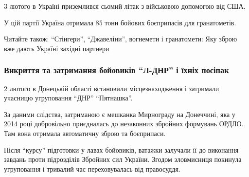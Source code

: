 3 лютого в Україні приземлився сьомий літак з військовою допомогою від США.

У цій партії Україна отримала 85 тонн бойових боєприпасів для гранатометів.

Читайте також: \enquote{Стінгери}, \enquote{Джавеліни}, вогнемети і
гранатомети: Яку зброю вже дають Україні західні партнери

\subsubsection{Викриття та затримання бойовиків \enquote{Л-ДНР} і їхніх
посіпак}

2 лютого в Донецькій області встановили місцезнаходження і затримали учасницю
угруповання \enquote{ДНР} \enquote{Пятнашка}.

За даними слідства, затриманою є мешканка Мирнограду на Донеччині, яка у 2014
році добровільно приєдналась до незаконних збройних формувань ОРДЛО. Там вона
отримала автоматичну зброю та боєприпаси.

Після \enquote{курсу} підготовки у лавах бойовиків, ватажки залучали її до
виконання завдань проти підрозділів Збройних сил України. Згодом зловмисниця
покинула угруповання і тривалий час переховувалась від правосуддя.
